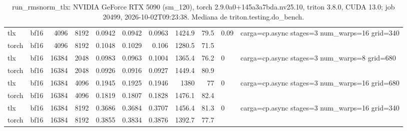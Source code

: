 \begin{table}[htbp]
\begin{tabular}{llrrrrrrrll}
    tlx & bf16 & 4096 & 8192 & 0.0942 & 0.0942 & 0.0963 & 1424.9 & 79.5 & 0.09 & carga=cp.async stages=3 num\_warps=16 grid=340 \\
    torch & bf16 & 4096 & 8192 & 0.1048 & 0.1029 & 0.106 & 1280.5 & 71.5 &  &  \\
    tlx & bf16 & 16384 & 2048 & 0.0983 & 0.0963 & 0.1004 & 1365.4 & 76.2 & 0 & carga=cp.async stages=3 num\_warps=8 grid=680 \\
    torch & bf16 & 16384 & 2048 & 0.0926 & 0.0916 & 0.0927 & 1449.4 & 80.9 &  &  \\
    tlx & bf16 & 16384 & 4096 & 0.1945 & 0.1925 & 0.1946 & 1380 & 77 & 0 & carga=cp.async stages=3 num\_warps=16 grid=680 \\
    torch & bf16 & 16384 & 4096 & 0.1819 & 0.1807 & 0.1828 & 1476.1 & 82.4 &  &  \\
    tlx & bf16 & 16384 & 8192 & 0.3686 & 0.3684 & 0.3707 & 1456.4 & 81.3 & 0 & carga=cp.async stages=3 num\_warps=16 grid=340 \\
    torch & bf16 & 16384 & 8192 & 0.3855 & 0.3834 & 0.3876 & 1392.7 & 77.7 &  &  \\
    \bottomrule
  \end{tabular}
  \caption{run\_rmsnorm\_tlx: NVIDIA GeForce RTX 5090 (sm\_120), torch 2.9.0a0+145a3a7bda.nv25.10, triton 3.8.0, CUDA 13.0; job 20499, 2026-10-02T09:23:38. Mediana de triton.testing.do\_bench.}
  \label{tab:run-rmsnorm-tlx}
\end{table}
